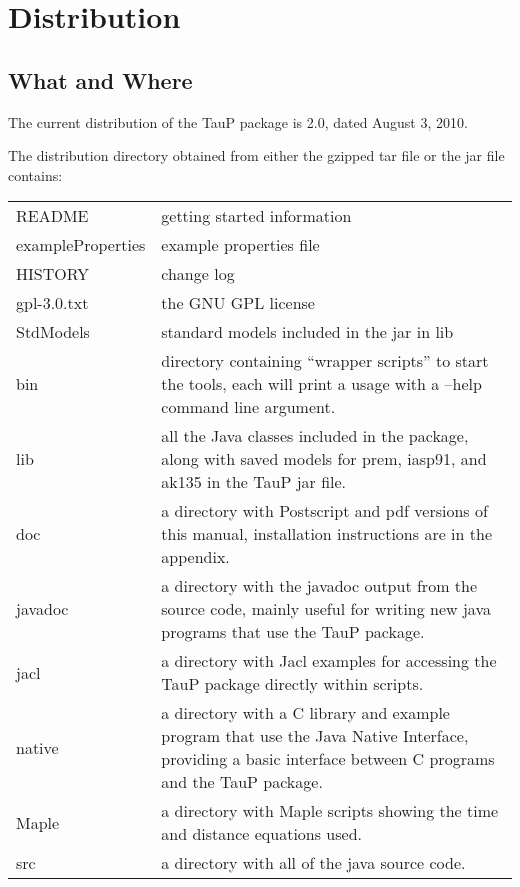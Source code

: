 
\section{Distribution}


\subsection{What and Where}
The current distribution of the TauP package is 2.0, dated August 3, 2010.

The distribution directory obtained from either the gzipped tar file or the jar file contains:

\begin{center}
\begin{tabular}{lp{4in}}
README & getting started information \\
exampleProperties & example properties file \\
HISTORY & change log \\
gpl-3.0.txt & the GNU GPL license \\
StdModels & standard models included in the jar in lib \\
bin & directory containing ``wrapper scripts'' to start the tools,
   each will print a usage with a --help command line argument. \\
lib & all the Java classes included in the package, along with
               saved models for prem, iasp91, and ak135 in the TauP jar file. \\
doc & a directory with Postscript and pdf versions of this manual,
installation instructions are in the appendix. \\
javadoc & a directory with the javadoc output from
the source code, mainly useful
for writing new java programs that use the TauP package. \\
jacl & a directory with Jacl examples for accessing the TauP package directly within scripts. \\
native & a directory with a C library and example program that use the
Java Native Interface, providing a basic interface between C programs
and the TauP package. \\
Maple & a directory with Maple scripts showing the time and distance equations
used. \\
src & a directory with all of the java source code. \\
\end{tabular}
\end{center}


